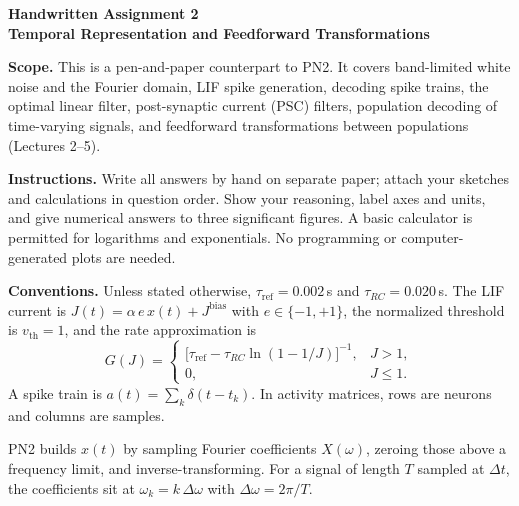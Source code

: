 \documentclass[10pt,letterpaper]{article}
\newcommand{\Jb}{J^{\mathrm{bias}}}
\newcommand{\tref}{\tau_{\mathrm{ref}}}
\newcommand{\trc}{\tau_{RC}}
\newcommand{\qsec}[1]{\vspace{8pt}{\large\bfseries #1}\par\vspace{2pt}}
\begin{document}
\begin{center}
{\Large\bfseries Handwritten Assignment 2}\\[2pt]
{\large\bfseries Temporal Representation and Feedforward Transformations}
\end{center}

\textbf{Scope.} This is a pen-and-paper counterpart to PN2. It covers band-limited white noise and the Fourier domain, LIF spike generation, decoding spike trains, the optimal linear filter, post-synaptic current (PSC) filters, population decoding of time-varying signals, and feedforward transformations between populations (Lectures 2--5).

\textbf{Instructions.} Write all answers by hand on separate paper; attach your sketches and calculations in question order. Show your reasoning, label axes and units, and give numerical answers to three significant figures. A basic calculator is permitted for logarithms and exponentials. No programming or computer-generated plots are needed.

\textbf{Conventions.} Unless stated otherwise, $\tref = 0.002$\,s and $\trc = 0.020$\,s. The LIF current is $J(t) = \alpha\, e\, x(t) + \Jb$ with $e \in \{-1,+1\}$, the normalized threshold is $v_{\mathrm{th}} = 1$, and the rate approximation is
\[
G(J) = \begin{cases} \big[\tref - \trc \ln(1 - 1/J)\big]^{-1}, & J > 1,\\ 0, & J \le 1. \end{cases}
\]
A spike train is $a(t) = \sum_k \delta(t - t_k)$. In activity matrices, rows are neurons and columns are samples.

\qsec{1. Band-limited white noise and the Fourier domain}
PN2 builds $x(t)$ by sampling Fourier coefficients $X(\omega)$, zeroing those above a frequency limit, and inverse-transforming. For a signal of length $T$ sampled at $\Delta t$, the coefficients sit at $\omega_k = k\,\Delta\omega$ with $\Delta\omega = 2\pi/T$.
\end{document}
